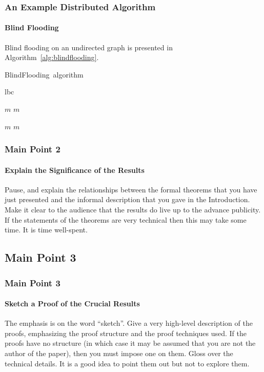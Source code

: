 \documentclass[11pt]{beamer}              %
\begin{document}
\begin{frame}
\frametitle{An Example Distributed Algorithm}
\framesubtitle{Blind Flooding}


Blind flooding on an undirected graph is presented in Algorithm~\ref{alg:blindflooding}.

\begin{center}
\begin{algorithm}[H]
	\scriptsize
	\def\algorithmlabel{BlindFlooding}
    \caption{\algorithmlabel\ algorithm}
    \label{alg:blindflooding}
    \begin{algorithmic}[1]
    	\Implement {\algorithmlabel}{cf} 
    	 {lbc} 
	\Need {}

        		
         { $m$ }
        		 { $m$  }
        		
         { $m$ }	
        		 { $m$  }
    \end{algorithmic}
\end{algorithm}
\end{center}


\end{frame}

\begin{frame}
\frametitle{Main Point 2}
\framesubtitle{Explain the Significance of the Results}
Pause, and explain the relationships between the formal theorems that you have just presented and the informal description that you gave in the Introduction. Make it clear to the audience that the results do live up to the advance publicity. If the statements of the theorems are very technical then this may take some time. It is time well-spent.

\end{frame}

\subsection{Main Point 3}
\begin{frame}
\frametitle{Main Point 3}
\framesubtitle{Sketch a Proof of the Crucial Results}
The emphasis is on the word ``sketch''. Give a very high-level description of the proofs, emphasizing the proof structure and the proof techniques used. If the proofs have no structure (in which case it may be assumed that you are not the author of the paper), then you must impose one on them. Gloss over the technical details. It is a good idea to point them out but not to explore them.
\end{frame}
\end{document}
